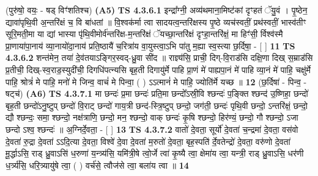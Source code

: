 \documentclass[17pt]{extarticle}
\begin{document}
                  \newline
                      (पुरु॑षो॒ वयः॒ - षड् विꣳ॑शतिश्च)  \textbf{(A5)} \newline \newline
                                        \textbf{ TS 4.3.6.1} \newline
                  इन्द्रा᳚ग्नी॒ अव्य॑थमाना॒मिष्ट॑कां दृꣳहतं ॅयु॒वं । पृ॒ष्ठेन॒ द्यावा॑पृथि॒वी अ॒न्तरि॑क्षं च॒ वि बा॑धतां ॥ वि॒श्वक॑र्मा त्वा सादयत्व॒न्तरि॑क्षस्य पृ॒ष्ठे व्यच॑स्वतीं॒ प्रथ॑स्वतीं॒ भास्व॑तीꣳ सूरि॒मती॒मा या द्यां भास्या पृ॑थि॒वीमोर्व॑न्तरि॑क्ष-म॒न्तरि॑क्षं ॅयच्छा॒न्तरि॑क्षं दृꣳहा॒न्तरि॑क्षं॒ मा हिꣳ॑सी॒ र्विश्व॑स्मै प्रा॒णाया॑पा॒नाय॑ व्या॒नायो॑दा॒नाय॑ प्रति॒ष्ठायै॑ च॒रित्रा॑य वा॒युस्त्वा॒ऽभि पा॑तु म॒ह्या स्व॒स्त्या छ॒र्दिषा॒ - [  ] \textbf{  11} \newline
                  \newline
                                \textbf{ TS 4.3.6.2} \newline
                  शन्त॑मेन॒ तया॑ दे॒व॑तयाऽङ्गिर॒स्वद्-ध्रु॒वा सी॑द ॥ राज्ञ्य॑सि॒ प्राची॒ दिग्-वि॒राड॑सि दक्षि॒णा दिख् स॒म्राड॑सि प्र॒तीची॒ दिख्-स्व॒राड॒स्युदी॑ची॒ दिगधि॑पत्न्यसि बृह॒ती दिगायु॑र्मे पाहि प्रा॒णं मे॑ पाह्यपा॒नं मे॑ पाहि व्या॒नं मे॑ पाहि॒ चक्षु॑र्मे पाहि॒ श्रोत्रं॑ मे पाहि॒ मनो॑ मे जिन्व॒ वाचं॑ मे पिन्वा॒ ( ) ऽऽत्मानं॑ मे पाहि॒ ज्योति॑र्मे यच्छ ॥ \textbf{  12 } \newline
                  \newline
                      (छ॒र्दिषा॑ - पिन्व॒ - षट्च॑)  \textbf{(A6)} \newline \newline
                                        \textbf{ TS 4.3.7.1} \newline
                  मा छन्दः॑ प्र॒मा छन्दः॑ प्रति॒मा छन्दो᳚ऽस्री॒वि श्छन्दः॑ प॒ङ्क्ति श्छन्द॑ उ॒ष्णिहा॒ छन्दो॑ बृह॒ती छन्दो॑ऽनु॒ष्टुप् छन्दो॑ वि॒राट् छन्दो॑ गाय॒त्री छन्द॑-स्त्रि॒ष्टुप् छन्दो॒ जग॑ती॒ छन्दः॑ पृथि॒वी छन्दो॒ ऽन्तरि॑क्षं॒ छन्दो॒ द्यौ श्छन्दः॒ समा॒ श्छन्दो॒ नक्ष॑त्राणि॒ छन्दो॒ मन॒ श्छन्दो॒ वाक् छन्दः॑ कृ॒षि श्छन्दो॒ हिर॑ण्यं॒ छन्दो॒ गौ श्छन्दो॒ ऽजा छन्दो ऽश्व॒ श्छन्दः॑ ॥ अ॒ग्निर्दे॒वता॒ - [  ] \textbf{  13} \newline
                  \newline
                                \textbf{ TS 4.3.7.2} \newline
                  वातो॑ दे॒वता॒ सूर्यो॑ दे॒वता॑ च॒न्द्रमा॑ दे॒वता॒ वस॑वो दे॒वता॑ रु॒द्रा दे॒वता॑ ऽऽदि॒त्या दे॒वता॒ विश्वे॑ दे॒वा दे॒वता॑ म॒रुतो॑ दे॒वता॒ बृह॒स्पति॑ र्दे॒वतेन्द्रो॑ दे॒वता॒ वरु॑णो दे॒वता॑ मू॒र्द्धाऽसि॒ राड् ध्रु॒वाऽसि॑ ध॒रुणा॑ य॒न्त्र्य॑सि॒ यमि॑त्री॒षे त्वो॒र्जे त्वा॑ कृ॒ष्यै त्वा॒ क्षेमा॑य त्वा॒ यन्त्री॒ राड् ध्रु॒वाऽसि॒ धर॑णी ध॒र्त्र्य॑सि॒ धरि॒त्र्यायु॑षे त्वा॒ ( ) वर्च॑से॒ त्वौज॑से त्वा॒ बला॑य त्वा ॥ \textbf{  14} \newline
\end{document}
